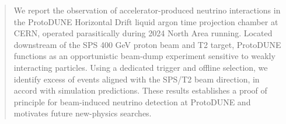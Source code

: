 \begin{abstract}
We report the observation of accelerator-produced neutrino interactions in the ProtoDUNE Horizontal Drift liquid argon time projection chamber at CERN, operated parasitically during 2024 North Area running. Located downstream of the SPS 400 GeV proton beam and T2 target, ProtoDUNE functions as an opportunistic beam-dump experiment sensitive to weakly interacting particles. Using a dedicated trigger and offline selection, we identify excess of events aligned with the SPS/T2 beam direction, in accord with simulation predictions. 
These results establishes a proof of principle for beam-induced neutrino detection at ProtoDUNE and motivates future new-physics searches.
\end{abstract}